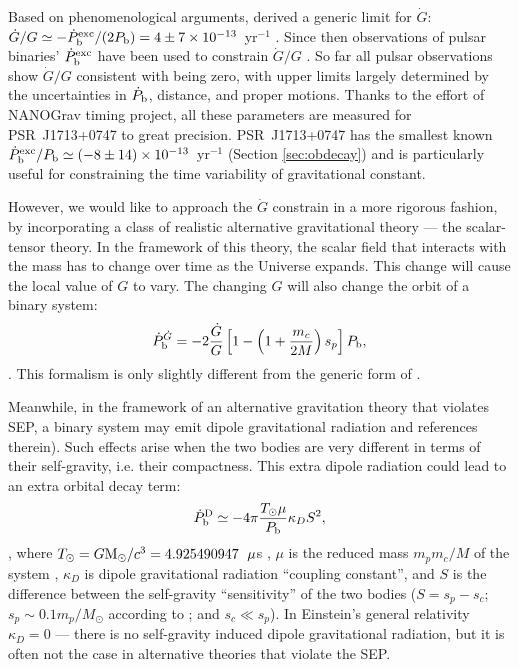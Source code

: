 Based on phenomenological arguments, \citet{dgt88} derived a generic limit for $\dot{G}$: 
$\dot{G}/G\simeq-\dot{P}_{\rm b}^{\rm exc}/(2P_{\rm
b})=4\pm7\times10^{-13}$~yr$^{-1}$ \citep{dgt88}.
Since then observations of pulsar binaries' $\dot{P}_{\rm b}^{\rm exc}$ have been used to 
constrain $\dot{G}/G$ \citep{ktr94, lwj+09, fwe+12}. 
So far all pulsar observations show $\dot{G}/G$ consistent with being zero, with 
upper limits largely determined by the uncertainties in 
$\dot P_{\rm b}$, distance, and proper motions.
Thanks to the effort of NANOGrav timing project, all these parameters are 
measured for PSR~J1713+0747 to great precision.  
PSR~J1713+0747 has the smallest known $\dot{P}_{\rm b}^{\rm exc}/P_{\rm
b}\simeq(-8\pm14)\times10^{-13}$~yr$^{-1}$ (Section \ref{sec:obdecay}) and is
particularly useful for constraining the time variability of gravitational
constant.

However, we would like to approach the $\dot{G}$ constrain in a more rigorous fashion,
by incorporating a class of realistic alternative gravitational theory --- the 
scalar-tensor theory.
In the framework of this theory,
the scalar field that interacts with the mass has to change over time as the
Universe expands. This change will cause the local value of
$G$ to vary. The changing $G$ will also change
the orbit of a binary system:
\begin{equation}
\dot{P}_{\rm b}^{\dot{G}} = -2 \frac{\dot{G}}{G}
\left[1-\left( 1+\frac{m_c}{2M}\right) s_p\right]P_{\rm b},
\end{equation} \citep{nor90}.
This formalism is only slightly different from the generic form of
\citet{dgt88}.

Meanwhile, in the framework of an alternative gravitation theory that violates
SEP, a binary system may emit dipole gravitational radiation \citealt{Will93, Will01, lwj+09, fwe+12} and references
therein). Such effects arise when the two bodies are very different in terms
of their self-gravity, i.e.  their compactness.
This extra dipole radiation could lead to an extra orbital decay term:
\begin{equation}
\dot{P}_{\rm b}^{\rm D} \simeq -4\pi\frac{T_{\odot}\mu}{P_{\rm b}}\kappa_D S^2,
\end{equation}
\citep{lwj+09}, where $T_{\odot}=G{\rm M_{\odot}}/c^3=4.925490947$~${\rm
\mu}$s \citep{lk05}, $\mu$ is the reduced mass $m_pm_c/M$ of the system , $\kappa_D $ is dipole
gravitational radiation ``coupling constant'', and $S$ is the difference
between the self-gravity ``sensitivity'' of the two bodies ($S = s_p - s_c$;
$s_p\sim0.1m_p/M_{\odot}$ according to \citealt{de92} ; and $s_c\ll s_p$).
In Einstein's general relativity $\kappa_D=0$ --- there is no self-gravity induced
dipole gravitational radiation, but it is often not the case in alternative
theories that violate the SEP.

